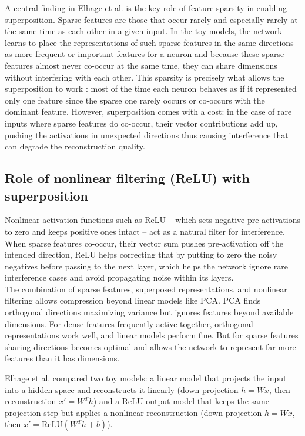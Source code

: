 \documentclass[12pt,a4paper]{report}
\begin{document}
A central finding in Elhage et al. is the key role of feature sparsity in enabling superposition. Sparse features are those that occur rarely and especially rarely at the same
time as each other in a given input. In the toy models, the network learns to place the
representations of such sparse features in the same directions as more frequent or important features for a neuron and because these sparse features almost never co-occur
at the same time, they can share dimensions without interfering with each other.
This sparsity is precisely what allows the superposition to work : most of the time
each neuron behaves as if it represented only one feature since the sparse one rarely
occurs or co-occurs with the dominant feature. However, superposition comes with a cost:
in the case of rare inputs where sparse features do co-occur, their vector contributions
add up, pushing the activations in unexpected directions thus causing interference that
can degrade the reconstruction quality.

\subsection{Role of nonlinear filtering (ReLU) with superposition}

Nonlinear activation functions such as ReLU – which sets negative pre-activations to zero and keeps positive ones intact – act as a natural filter for interference. When sparse features co-occur, their vector sum pushes pre-activation off the intended direction, ReLU helps correcting that by putting to zero the noisy negatives before passing to the next layer, which helps the network ignore rare interference cases and avoid propagating noise within its layers.\\ 

The combination of sparse features, superposed representations, and nonlinear filtering allows compression beyond linear models like PCA. PCA finds orthogonal directions maximizing variance but ignores features beyond available dimensions. For dense features frequently active together, orthogonal representations work well, and linear models perform fine. But for sparse features sharing directions becomes optimal and allows the network to represent far more features than it has dimensions. 

Elhage et al. compared two toy models: a linear model that projects the input into a hidden space and reconstructs it linearly (down-projection \(h = W x\), then reconstruction \(x' = W^{T} h\)) and a ReLU output model that keeps the same projection step but applies a nonlinear reconstruction (down-projection \(h = W x\), then \(x' = \mathrm{ReLU}(W^{T} h + b)\)).\\
\end{document}
